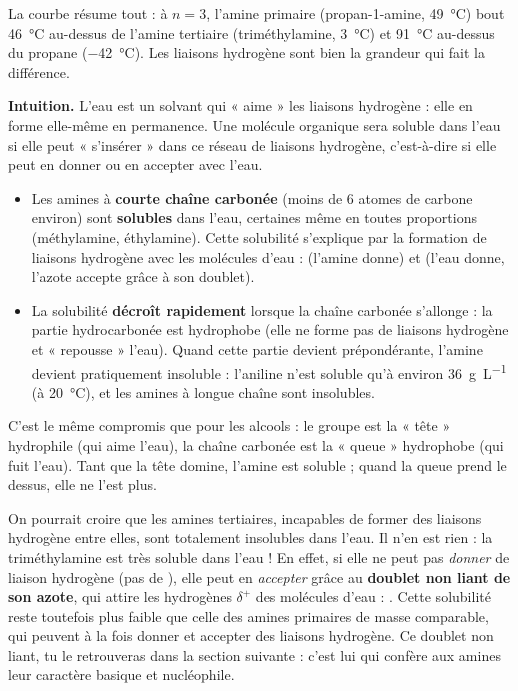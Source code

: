 \documentclass[11pt]{article}
\newcommand{\cle}[1]{{\popxbold\color{popdark}#1}}
\newcounter{popsec}
\newcounter{popsub}
\newcommand{\courssub}[1]{%
  \stepcounter{popsub}%
  \par\vspace{9pt}\noindent{\popxbold\fontsize{11.5}{13}\selectfont\color{popink}{\color{poporange}\thepopsec.\thepopsub}\hspace{6pt}#1}\par\nopagebreak\vspace{4pt}
}
\begin{document}
La courbe résume tout : à $n = 3$, l'amine primaire (propan-1-amine, \SI{49}{\celsius}) bout \SI{46}{\celsius} au-dessus de l'amine tertiaire (triméthylamine, \SI{3}{\celsius}) et \SI{91}{\celsius} au-dessus du propane (\SI{-42}{\celsius}). Les liaisons hydrogène sont bien la grandeur qui fait la différence.

\courssub{Solubilité des amines dans l'eau}

\textbf{Intuition.} L'eau est un solvant qui « aime » les liaisons hydrogène : elle en forme elle-même en permanence. Une molécule organique sera soluble dans l'eau si elle peut « s'insérer » dans ce réseau de liaisons hydrogène, c'est-à-dire si elle peut en donner ou en accepter avec l'eau.

\begin{propriete}
\begin{itemize}
\item Les amines à \textbf{courte chaîne carbonée} (moins de 6 atomes de carbone environ) sont \textbf{solubles} dans l'eau, certaines même en toutes proportions (méthylamine, éthylamine). Cette solubilité s'explique par la formation de liaisons hydrogène avec les molécules d'eau :  (l'amine donne) et  (l'eau donne, l'azote accepte grâce à son doublet).
\item La solubilité \textbf{décroît rapidement} lorsque la chaîne carbonée s'allonge : la partie hydrocarbonée  est \cle{hydrophobe} (elle ne forme pas de liaisons hydrogène et « repousse » l'eau). Quand cette partie devient prépondérante, l'amine devient pratiquement insoluble : l'aniline  n'est soluble qu'à environ \SI{36}{g.L^{-1}} (à \SI{20}{\celsius}), et les amines à longue chaîne sont insolubles.
\end{itemize}
\end{propriete}

C'est le même compromis que pour les alcools : le groupe  est la « tête » \cle{hydrophile} (qui aime l'eau), la chaîne carbonée est la « queue » \cle{hydrophobe} (qui fuit l'eau). Tant que la tête domine, l'amine est soluble ; quand la queue prend le dessus, elle ne l'est plus.

\begin{savaistu}
On pourrait croire que les amines tertiaires, incapables de former des liaisons hydrogène entre elles, sont totalement insolubles dans l'eau. Il n'en est rien : la triméthylamine est très soluble dans l'eau ! En effet, si elle ne peut pas \emph{donner} de liaison hydrogène (pas de ), elle peut en \emph{accepter} grâce au \textbf{doublet non liant de son azote}, qui attire les hydrogènes $\delta^+$ des molécules d'eau : . Cette solubilité reste toutefois plus faible que celle des amines primaires de masse comparable, qui peuvent à la fois donner et accepter des liaisons hydrogène. Ce doublet non liant, tu le retrouveras dans la section suivante : c'est lui qui confère aux amines leur caractère basique et nucléophile.
\end{savaistu}
\end{document}
